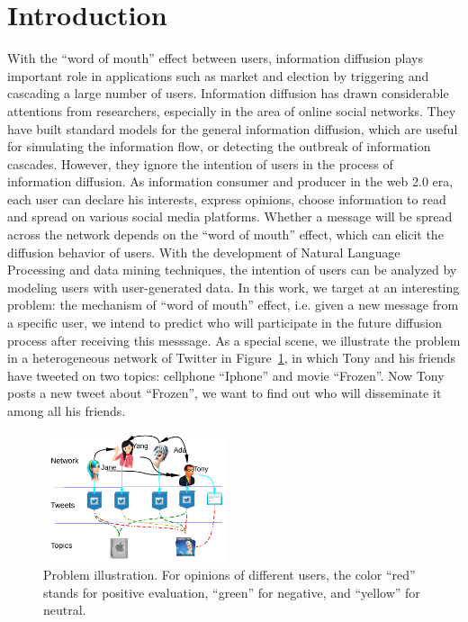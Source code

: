 \documentclass[letterpaper]{article}
\begin{document}
\section{Introduction}
\label{introduction}
\noindent With the ``word of mouth'' effect between users, information diffusion plays important role in applications such as market and election by triggering and cascading a large number of users. Information diffusion has drawn considerable attentions from researchers, especially in the area of online social networks. They have built standard models for the general information diffusion, which are useful for simulating the information flow\cite{goldenberg2001talk,kempe2003maximizing}, or detecting the outbreak of information cascades\cite{cheng2014can}. However, they ignore the intention of users in the process of information diffusion. As information consumer and producer in the web 2.0 era, each user can declare his interests, express opinions, choose information to read and spread on various social media platforms. Whether a message will be spread across the network depends on the ``word of mouth'' effect, which can elicit the diffusion behavior of users. With the development of Natural Language Processing and data mining techniques, the intention of users can be analyzed by modeling users with user-generated data. In this work, we target at an interesting problem: the mechanism of ``word of mouth'' effect, i.e. given a new message from a specific user, we intend to predict who will participate in the future diffusion process after receiving this messsage. 
As a special scene, we illustrate the problem in a heterogeneous network of Twitter in Figure~\ref{fig00}, in which Tony and his friends have tweeted on two topics: cellphone ``Iphone'' and movie ``Frozen''. Now Tony posts a new tweet about ``Frozen'', we want to find out who will disseminate it among all his friends.
\begin{figure}[htb]
\centering
\includegraphics[width=2.2in,height=1.5in]{Mexample.pdf}
\caption{Problem illustration. For opinions of different users, the color ``red'' stands for positive evaluation, ``green'' for negative, and ``yellow'' for neutral.}
\label{fig00}
\end{figure}
\end{document}
